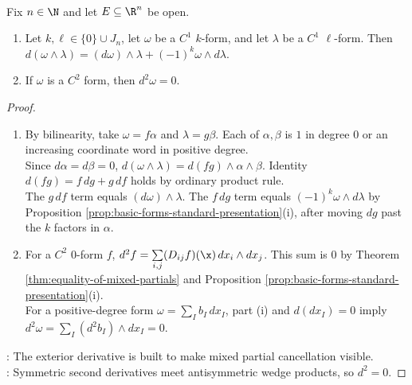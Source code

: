\begin{theorem} \label{thm:exterior-derivative-basic-laws} \\
Fix $n\in\N$ and let $E\subseteq\R^n$ be open.
\begin{enumerate}[label=(\roman*)]
\setlength{\itemsep}{0pt}
\item Let $k,\ell\in\{0\}\cup J_n$, let $\omega$ be a $C^1$ $k$-form, and let $\lambda$ be a $C^1$ $\ell$-form. Then $d(\omega\wedge\lambda)=(d\omega)\wedge\lambda+(-1)^k\omega\wedge d\lambda$.
\item If $\omega$ is a $C^2$ form, then $d^2\omega=0$.
\end{enumerate}
\begin{proof}
\begin{enumerate}[label=(\roman*)]
\setlength{\itemsep}{0pt}
\item By bilinearity, take $\omega=f\alpha$ and $\lambda=g\beta$. Each of $\alpha,\beta$ is $1$ in degree $0$ or an increasing coordinate word in positive degree.\\
Since $d\alpha=d\beta=0$, $d(\omega\wedge\lambda)=d(fg)\wedge\alpha\wedge\beta$. Identity $d(fg)=f\,dg+g\,df$ holds by ordinary product rule.\\
The $g\,df$ term equals $(d\omega)\wedge\lambda$. The $f\,dg$ term equals $(-1)^k\omega\wedge d\lambda$ by Proposition \ref{prop:basic-forms-standard-presentation}(i), after moving $dg$ past the $k$ factors in $\alpha$.
\item For a $C^2$ $0$-form $f$, $d^2f=\sum\limits_{i,j}(D_{ij}f)(\x)\,dx_i\wedge dx_j$. This sum is $0$ by Theorem \ref{thm:equality-of-mixed-partials} and Proposition \ref{prop:basic-forms-standard-presentation}(i).\\
For a positive-degree form $\omega=\sum\limits_I b_I\,dx_I$, part (i) and $d(dx_I)=0$ imply $d^2\omega=\sum\limits_I(d^2b_I)\wedge dx_I=0$.
\end{enumerate}
: The exterior derivative is built to make mixed partial cancellation visible.\\
: Symmetric second derivatives meet antisymmetric wedge products, so $d^2=0$.
\end{proof}
\end{theorem}

